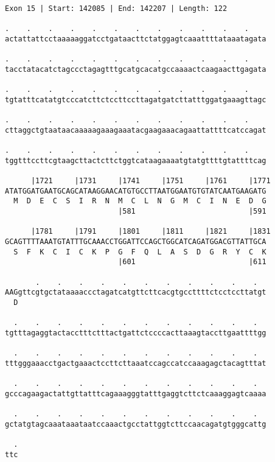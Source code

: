 \documentclass{article}
\begin{document}
\begin{Verbatim}
Exon 15 | Start: 142085 | End: 142207 | Length: 122
 
.    .    .    .    .    .    .    .    .    .    .    .    
actattattcctaaaaaggatcctgataacttctatggagtcaaattttataaatagata
  
.    .    .    .    .    .    .    .    .    .    .    .    
tacctatacatctagccctagagtttgcatgcacatgccaaaactcaagaacttgagata
  
.    .    .    .    .    .    .    .    .    .    .    .    
tgtatttcatatgtcccatcttctccttccttagatgatcttatttggatgaaagttagc
  
.    .    .    .    .    .    .    .    .    .    .    .    
cttaggctgtaataacaaaaagaaagaaatacgaagaaacagaattattttcatccagat
  
.    .    .    .    .    .    .    .    .    .    .    .    
tggtttccttcgtaagcttactcttctggtcataagaaaatgtatgttttgtattttcag
  
      |1721     |1731     |1741     |1751     |1761     |1771
ATATGGATGAATGCAGCATAAGGAACATGTGCCTTAATGGAATGTGTATCAATGAAGATG
  M  D  E  C  S  I  R  N  M  C  L  N  G  M  C  I  N  E  D  G
                          |581                          |591
  
      |1781     |1791     |1801     |1811     |1821     |1831
GCAGTTTTAAATGTATTTGCAAACCTGGATTCCAGCTGGCATCAGATGGACGTTATTGCA
  S  F  K  C  I  C  K  P  G  F  Q  L  A  S  D  G  R  Y  C  K
                          |601                          |611
  
       .    .    .    .    .    .    .    .    .    .    .  
AAGgttcgtgctataaaaccctagatcatgttcttcacgtgccttttctcctccttatgt
  D                                                         
  
  .    .    .    .    .    .    .    .    .    .    .    .  
tgtttagaggtactacctttctttactgattctccccacttaaagtaccttgaattttgg
  
  .    .    .    .    .    .    .    .    .    .    .    .  
tttgggaaacctgactgaaactccttcttaaatccagccatccaaagagctacagtttat
  
  .    .    .    .    .    .    .    .    .    .    .    .  
gcccagaagactattgttatttcagaaagggtatttgaggtcttctcaaaggagtcaaaa
  
  .    .    .    .    .    .    .    .    .    .    .    .  
gctatgtagcaaataaataatccaaactgcctattggtcttccaacagatgtgggcattg
  
  .
ttc
\end{Verbatim}
\newpage
\end{document}
